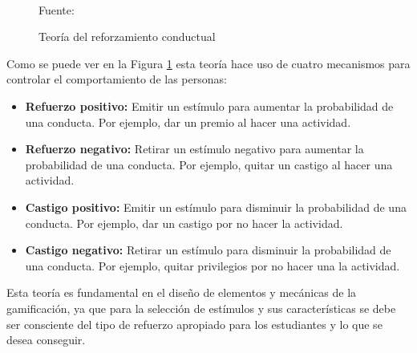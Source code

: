 \begin{figure}[ht]
\caption{Teoría del reforzamiento conductual}
\label{img:TRC}
\centering
{}
\\
{\footnotesize Fuente: }
\end{figure}

Como se puede ver en la Figura \ref{img:TRC} esta teoría hace uso de cuatro mecanismos para controlar el
comportamiento de las personas:

\begin{itemize}
\item \textbf{Refuerzo positivo:} Emitir un estímulo para aumentar la probabilidad de una conducta. Por 
ejemplo, dar un premio al hacer una actividad.
\item \textbf{Refuerzo negativo:} Retirar un estímulo negativo para aumentar la probabilidad de una conducta.
Por ejemplo, quitar un castigo al hacer una actividad.
\item \textbf{Castigo positivo:} Emitir un estímulo para disminuir la probabilidad de una conducta. Por 
ejemplo, dar un castigo por no hacer la actividad.
\item \textbf{Castigo negativo:} Retirar un estímulo para disminuir la probabilidad de una conducta. Por 
ejemplo, quitar privilegios por no hacer una la actividad.
\end{itemize}

Esta teoría es fundamental en el diseño de elementos y mecánicas de la gamificación, ya que para la selección 
de estímulos y sus características se debe ser consciente del tipo de refuerzo apropiado para los estudiantes 
y lo que se desea conseguir.


